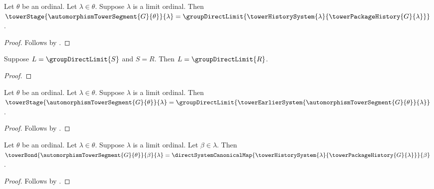 \begin{proposition}\label{automorphism_tower_limit_history_stage}
    Let $\theta$ be an ordinal.
    Let $\lambda\in\theta$.
    Suppose $\lambda$ is a limit ordinal.
    Then $\towerStage{\automorphismTowerSegment{G}{\theta}}{\lambda}=
        \groupDirectLimit{\towerHistorySystem{\lambda}{
            \towerPackageHistory{G}{\lambda}}}$.
\end{proposition}
\begin{proof}
    Follows by
        .
\end{proof}

\begin{proposition}\label{tower_limit_stage_system_rewrite}
    Suppose $L=\groupDirectLimit{S}$ and $S=R$.
    Then $L=\groupDirectLimit{R}$.
\end{proposition}
\begin{proof}
\end{proof}

\begin{proposition}\label{automorphism_tower_limit_stage}
    Let $\theta$ be an ordinal.
    Let $\lambda\in\theta$.
    Suppose $\lambda$ is a limit ordinal.
    Then $\towerStage{\automorphismTowerSegment{G}{\theta}}{\lambda}=
        \groupDirectLimit{\towerEarlierSystem{
            \automorphismTowerSegment{G}{\theta}}{\lambda}}$.
\end{proposition}
\begin{proof}
    Follows by
        .
\end{proof}

\begin{proposition}\label{automorphism_tower_limit_history_bond}
    Let $\theta$ be an ordinal.
    Let $\lambda\in\theta$.
    Suppose $\lambda$ is a limit ordinal.
    Let $\beta\in\lambda$.
    Then $\towerBond{\automorphismTowerSegment{G}{\theta}}
            {\beta}{\lambda}=
        \directSystemCanonicalMap{
            \towerHistorySystem{\lambda}{
                \towerPackageHistory{G}{\lambda}}}{\beta}$.
\end{proposition}
\begin{proof}
    Follows by
        .
\end{proof}

